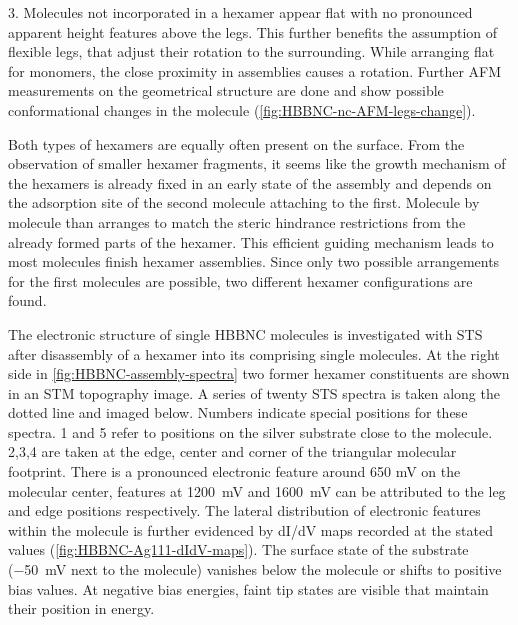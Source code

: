 3. Molecules not incorporated in a hexamer appear flat with no pronounced apparent height features above the legs. This further benefits the assumption of flexible legs, that adjust their rotation to the surrounding. While arranging flat for monomers, the close proximity in assemblies causes a rotation. Further AFM measurements on the geometrical structure are done and show possible conformational changes in the molecule (\autoref{fig:HBBNC-nc-AFM-legs-change}).

Both types of hexamers are equally often present on the surface. From the observation of smaller hexamer fragments, it seems like the growth mechanism of the hexamers is already fixed in an early state of the assembly and depends on the adsorption site of the second molecule attaching to the first. Molecule by molecule than arranges to match the steric hindrance restrictions from the already formed parts of the hexamer. This efficient guiding mechanism leads to most molecules finish hexamer assemblies. Since only two possible arrangements for the first molecules are possible, two different hexamer configurations are found.

The electronic structure of single HBBNC molecules is investigated with STS after disassembly of a hexamer into its comprising single molecules. At the right side in \autoref{fig:HBBNC-assembly-spectra} two former hexamer constituents are shown in an STM topography image. A series of twenty STS spectra is taken along the dotted line and imaged below. Numbers indicate special positions for these spectra. 1 and 5 refer to positions on the silver substrate close to the molecule. 2,3,4 are taken at the edge, center and corner of the triangular molecular footprint. There is a pronounced electronic feature around 650 mV on the molecular center, features at \SI{1200}{\milli \volt} and \SI{1600}{\milli \volt} can be attributed to the leg and edge positions respectively. The lateral distribution of electronic features within the molecule is further evidenced by dI/dV maps recorded at the stated values (\autoref{fig:HBBNC-Ag111-dIdV-maps}).
The surface state of the substrate (\SI{-50}{\milli \volt} next to the molecule) vanishes below the molecule or shifts to positive bias values. At negative bias energies, faint tip states are visible that maintain their position in energy. 



